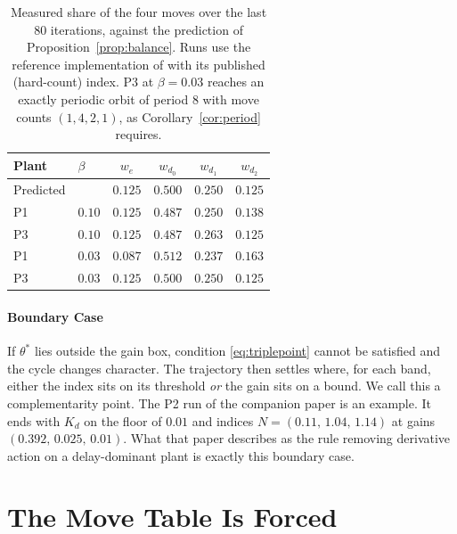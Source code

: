 \documentclass[letterpaper, 10pt, conference, twocolumn]{ieeeconf}
\begin{document}
\begin{table}[t]
\small
\centering
\caption{Measured share of the four moves over the last $80$ iterations,
against the prediction of Proposition~\ref{prop:balance}. Runs use the
reference implementation of \cite{Paper1} with its published (hard-count)
index. P3 at $\beta = 0.03$ reaches an exactly periodic orbit of period $8$
with move counts $(1,4,2,1)$, as Corollary~\ref{cor:period} requires.
}
\label{tab:duty}
\begin{tabular}{llcccc}
\toprule
Plant & $\beta$ & $w_e$ & $w_{d_0}$ & $w_{d_1}$ & $w_{d_2}$ \\
\midrule
Predicted &      & $0.125$ & $0.500$ & $0.250$ & $0.125$ \\
\midrule
P1 & $0.10$ & $0.125$ & $0.487$ & $0.250$ & $0.138$ \\
P3 & $0.10$ & $0.125$ & $0.487$ & $0.263$ & $0.125$ \\
P1 & $0.03$ & $0.087$ & $0.512$ & $0.237$ & $0.163$ \\
P3 & $0.03$ & $0.125$ & $0.500$ & $0.250$ & $0.125$ \\
\bottomrule
\end{tabular}
\end{table}

\paragraph{Boundary Case} If $\theta^*$ lies outside the gain box, condition
\eqref{eq:triplepoint} cannot be satisfied and the cycle changes character.
The trajectory then settles where, for each band, either the index sits on its
threshold \emph{or} the gain sits on a bound. We call this a complementarity
point. The P2 run of the companion paper is an example. It ends with $K_d$ on
the floor of $0.01$ and indices $N = (0.11,\, 1.04,\, 1.14)$ at gains
$(0.392,\, 0.025,\, 0.01)$. What that paper describes as the rule removing
derivative action on a delay-dominant plant is exactly this boundary case.

\section{The Move Table Is Forced}
\label{sec:why}
\end{document}
